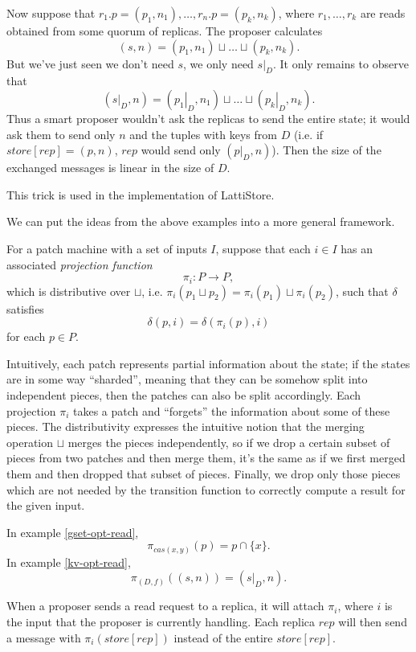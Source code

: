 \documentclass[12pt,a4paper,en]{pracamgr}
\newcommand{\ti}[1]{\textit{#1}}
\newcommand{\res}[2]{\left.#1\right|_{#2}}
\begin{document}
\begin{ex}
    Now suppose that $r_1.p = (p_1, n_1), \dots, r_n.p = (p_k, n_k)$, where $r_1, \dots, r_k$ are reads obtained from some quorum of replicas. The proposer calculates
    $$ (s, n) = (p_1, n_1) \sqcup \dots \sqcup (p_k, n_k). $$
    But we've just seen we don't need $s$, we only need $\res{s}{D}$. It only remains to observe that
    $$ (\res{s}{D}, n) = (\res{p_1}{D}, n_1) \sqcup \dots \sqcup (\res{p_k}{D}, n_k). $$
    Thus a smart proposer wouldn't ask the replicas to send the entire state; it would ask them to send only $n$ and the tuples with keys from $D$ (i.e. if $store[rep] = (p, n)$, $rep$ would send only $(\res{p}{D}, n)$). Then the size of the exchanged messages is linear in the size of $D$.

    This trick is used in the implementation of LattiStore.
\end{ex}

We can put the ideas from the above examples into a more general framework.

For a patch machine with a set of inputs $I$, suppose that each $i \in I$ has an associated \ti{projection function}
$$ \pi_i: P \rightarrow P, $$
which is distributive over $\sqcup$, i.e. $\pi_i(p_1 \sqcup p_2) = \pi_i(p_1) \sqcup \pi_i(p_2)$, such that $\delta$ satisfies
$$ \delta(p, i) = \delta(\pi_i(p), i) $$
for each $p \in P$.

Intuitively, each patch represents partial information about the state; if the states are in some way ``sharded'', meaning that they can be somehow split into independent pieces, then the patches can also be split accordingly. Each projection $\pi_i$ takes a patch and ``forgets'' the information about some of these pieces. The distributivity expresses the intuitive notion that the merging operation $\sqcup$ merges the pieces independently, so if we drop a certain subset of pieces from two patches and then merge them, it's the same as if we first merged them and then dropped that subset of pieces. Finally, we drop only those pieces which are not needed by the transition function to correctly compute a result for the given input. 

In example \ref{gset-opt-read},
$$ \pi_{cas(x, y)}(p) = p \cap \{x\}. $$
In example \ref{kv-opt-read},
$$ \pi_{(D, f)}((s, n)) = (\res{s}{D}, n). $$

When a proposer sends a read request to a replica, it will attach $\pi_i$, where $i$ is the input that the proposer is currently handling. Each replica $rep$ will then send a message with $\pi_i(store[rep])$ instead of the entire $store[rep]$.
\end{document}
